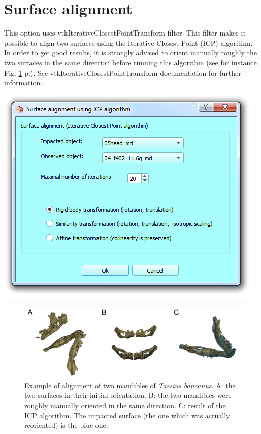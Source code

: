 \section{Surface alignment}\label{surface_alignment_section}
\noindent
\begin{minipage}{0.5\textwidth}
This option uses vtkIterativeClosestPointTransform filter. This filter makes it possible to align two surfaces using the Iterative Closest Point (ICP) algorithm. In order to get good results, it is strongly advised to orient manually roughly the two surfaces in the same direction before running this algorithm 
(see for instance Fig. \ref{surface_alignment} p.\pageref{surface_alignment}). See vtkIterativeClosestPointTransform documentation for further information.



\end{minipage}    
\begin{minipage}{0.5\textwidth}\centering
  \includegraphics[scale=0.5]{images/09/alignment/surface_alignment_dialog.png}
 \end{minipage} 

\begin{figure}
  \centering
  \includegraphics[scale=0.21]{images/09/alignment/surface_alignment.png} 
	\caption{Example of alignment of two mandibles of \textit{Tarsius bancanus}. A: the two surfaces in their initial orientation. B: the two mandibles were roughly manually oriented in the same direction. C: result of the ICP algorithm. The impacted surface (the one which was actually reoriented) is the blue one. }
 \label{surface_alignment}
\end{figure}



